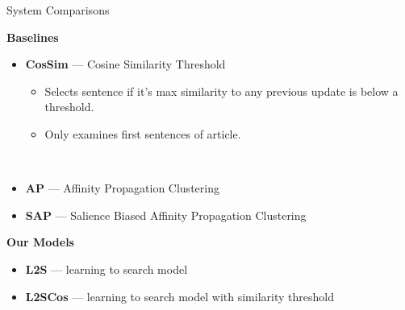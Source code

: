 \begin{frame}{System Comparisons}

\textbf{Baselines}

\begin{itemize}
    \item \textbf{CosSim} --- Cosine Similarity Threshold
    \begin{itemize}
        \item Selects sentence if it's max similarity to any previous update is below a threshold.
        \item Only examines first sentences of article. 
    \end{itemize}
~\\
\item \textbf{AP} --- Affinity Propagation Clustering
\item \textbf{SAP} ---  Salience Biased Affinity Propagation Clustering 
    \end{itemize}

\textbf{Our Models}

\begin{itemize}
    \item \textbf{L2S} --- learning to search model
    \item \textbf{L2SCos} --- learning to search model with similarity threshold
\end{itemize}

\end{frame}

